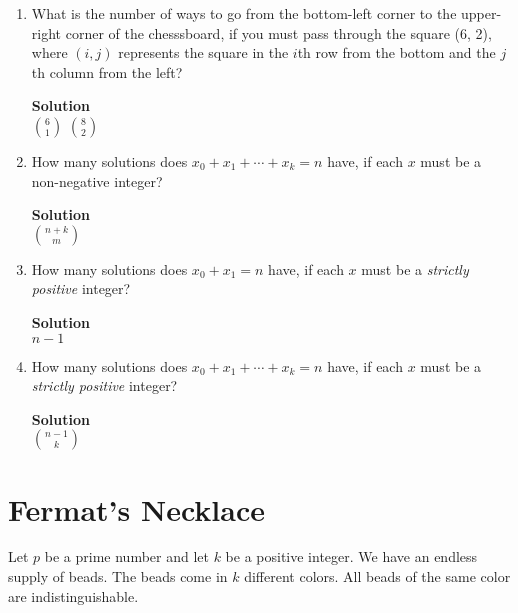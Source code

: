 \documentclass[11pt]{article}
\newcommand*{\Question}[1]{\section{#1}}
\newenvironment{Parts}{\begin{enumerate}[label=(\alph*)]}{\end{enumerate}}
\newcommand*{\Part}{\item}
\begin{document}
\begin{Parts}
\Part What is the number of ways to go from the bottom-left corner to 
the upper-right corner of the chesssboard, if you must pass through the square 
(6, 2), where $(i, j)$ represents the square in the $i$th row from the
bottom and the $j$th column from the left?
\begin{mdframed} \textbf{Solution} \\
$\binom{6}{1}$
$\binom{8}{2}$
\end{mdframed}

\Part How many solutions does $x_0 + x_1 + \cdots + x_k = n$ have, if each $x$ must be a non-negative integer?
\begin{mdframed} \textbf{Solution} \\
$\binom{n+k}{m}$
\end{mdframed}

\Part How many solutions does $x_0 + x_1 = n$ have, if each $x$ must be a \emph{strictly positive} integer?
\begin{mdframed} \textbf{Solution} \\
$n-1$
\end{mdframed}

\Part How many solutions does $x_0 + x_1 + \cdots + x_k = n$ have, if each $x$ must be a \emph{strictly positive} integer?
\begin{mdframed} \textbf{Solution} \\
$\binom{n-1}{k}$
\end{mdframed}

\end{Parts}


\Question{Fermat's Necklace}

  Let $p$ be a prime number and let $k$ be a positive integer.  We have an endless supply of beads. The beads come in
  $k$ different colors. All beads of the same color are indistinguishable.
\end{document}
